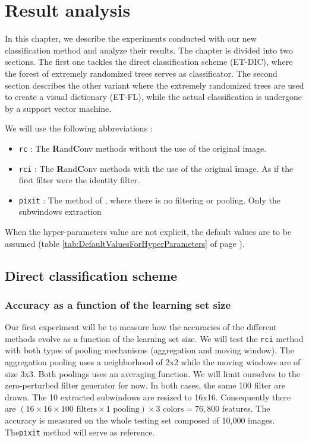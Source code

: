 \documentclass[a4paper]{report}
\begin{document}
\chapter{Result analysis}
In this chapter, we describe the experiments conducted with our new classification method and analyze their results. The chapter is divided into two sections. The first one tackles the direct classification scheme (ET-DIC), where the forest of extremely randomized trees serves as classificator. The second section describes the other variant where the extremely randomized trees are used to create a visual dictionary (ET-FL), while the actual classification is undergone by a support vector machine.
\par
We will use the following abbreviations :
\begin{itemize}
	\item \texttt{rc} : The \textbf{R}and\textbf{C}onv methods without the use of the original image.
	\item \texttt{rci} : The \textbf{R}and\textbf{C}onv methods with the use of the original \textbf{i}mage. As if the first filter were the identity filter.
	\item \texttt{pixit} : The method of \cite{}, where there is no filtering or pooling. Only the subwindows extraction
\end{itemize}
When the hyper-parameters value are not explicit, the default values are to be assumed (table \ref{tab:DefaultValuesForHyperParameters} of page \pageref{tab:DefaultValuesForHyperParameters}).
	\section{Direct classification scheme}
	
		\subsection{Accuracy as a function of the learning set size}
		Our first experiment will be to measure how the accuracies of the different methods evolve as a function of the learning set size. We will test the \texttt{rci} method with both types of pooling mechanisms (aggregation and moving window). The aggregation pooling uses a neighborhood of 2x2 while the moving windows are of size 3x3. Both poolings uses an averaging function. We will limit ourselves to the zero-perturbed filter generator for now. In both cases, the same 100 filter are drawn. The 10 extracted subwindows are resized to 16x16. Consequently there are $(16 \times 16 \times 100 \text{ filters} \times 1 \text{ pooling})\times 3 \text{ colors} = 76,800$ features. The accuracy is measured on the whole testing set composed of 10,000 images. The\texttt{pixit} method will serve as reference.
\end{document}
